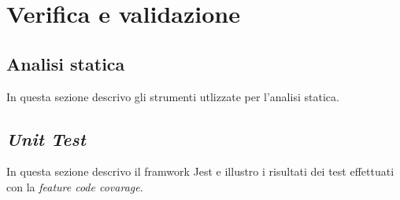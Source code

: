 \section{Verifica e validazione}

\subsection{Analisi statica}
In questa sezione descrivo gli strumenti utlizzate per l'analisi statica.

\subsection{\emph{Unit Test}}
In questa sezione descrivo il framwork Jest e illustro i risultati dei test effettuati con la \emph{feature code covarage}.